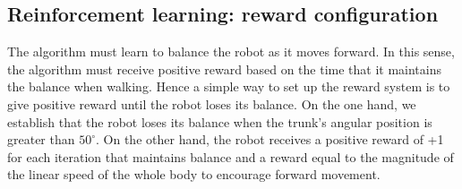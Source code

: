 \subsection{Reinforcement learning: reward configuration}
The algorithm must learn to balance the robot as it moves forward. In this sense, the algorithm must receive positive reward based on the time that it maintains the balance when walking. Hence a simple way to set up the reward system is to give positive reward until the robot loses its balance. On the one hand, we establish that the robot loses its balance when the trunk's angular position is greater than $50^{\circ}$. On the other hand, the robot receives a positive reward of +1 for each iteration that maintains balance and a reward equal to the magnitude of the linear speed of the whole body to encourage forward movement.




